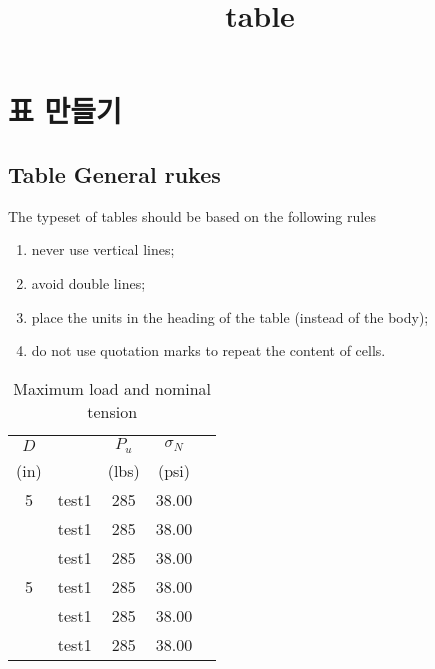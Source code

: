 \documentclass[12pt,a4paper]{report}
\begin{document}
		\title{table}
		\maketitle
		
		\doublespace
		
		\newpage
		\tableofcontents
		\listoffigures
		\listoftables
		
		\setlength{\parindent}{0cm}
		
\newpage
\chapter{표 만들기}
		

\clearpage
\section{Table General rukes}
\null

The typeset of tables should be based on the following rules
\begin{enumerate}
	\item never use vertical lines;
	\item avoid double lines;
	\item place the units in the heading of the table (instead of the body);
	\item do not use quotation marks to repeat the content of cells.
\end{enumerate}



	\begin{table}[hbp]
	\caption{Maximum load and nominal tension}
	\centering
	\begin{tabular}{c l c c c}
	\toprule
	$D$  	&& $P_u$ 	& $\sigma_N$ \\
	(in)		&&(lbs)	& (psi) \\
	\toprule
	5   	& test1   & 285  & 38.00 \\
		& test1   & 285  & 38.00 \\
        	& test1   & 285  & 38.00 \\
	\midrule
	5   	& test1   & 285  & 38.00 \\
		& test1   & 285  & 38.00 \\
		& test1   & 285  & 38.00 \\
	\bottomrule
	\end{tabular}%
	\label{aggiungi}%
	\end{table}%
	
\end{document}
